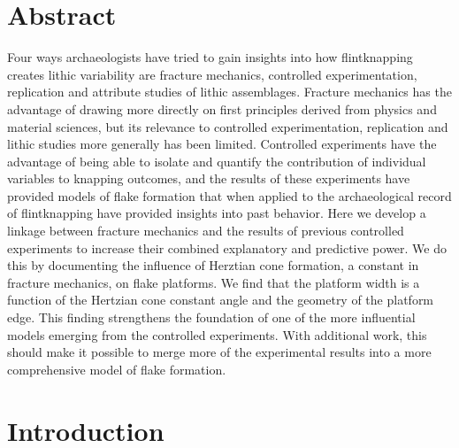 \documentclass[10pt,letterpaper]{article}
\begin{document}
\section*{Abstract}
Four ways archaeologists have tried to gain insights into how
flintknapping creates lithic variability are fracture mechanics,
controlled experimentation, replication and attribute studies of lithic
assemblages. Fracture mechanics has the advantage of drawing more
directly on first principles derived from physics and material sciences,
but its relevance to controlled experimentation, replication and lithic
studies more generally has been limited. Controlled experiments have the
advantage of being able to isolate and quantify the contribution of
individual variables to knapping outcomes, and the results of these
experiments have provided models of flake formation that when applied to
the archaeological record of flintknapping have provided insights into
past behavior. Here we develop a linkage between fracture mechanics and
the results of previous controlled experiments to increase their
combined explanatory and predictive power. We do this by documenting the
influence of Herztian cone formation, a constant in fracture mechanics,
on flake platforms. We find that the platform width is a function of the
Hertzian cone constant angle and the geometry of the platform edge. This
finding strengthens the foundation of one of the more influential models
emerging from the controlled experiments. With additional work, this
should make it possible to merge more of the experimental results into a
more comprehensive model of flake formation.


\linenumbers

\hypertarget{introduction}{%
\section{Introduction}\label{introduction}}
\end{document}
